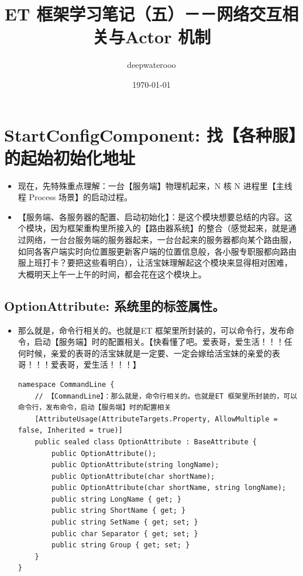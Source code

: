 \documentclass[9pt, b5paper]{article}
\author{deepwaterooo}
\date{\today}
\title{ET 框架学习笔记（五）－－网络交互相关与Actor 机制}
\begin{document}
\maketitle
\tableofcontents


\section{StartConfigComponent: 找【各种服】的起始初始化地址}
\label{sec-1}
\begin{itemize}
\item 现在，先特殊重点理解：一台【服务端】物理机起来，N 核 N 进程里【主线程 Process 场景】的启动过程。
\item 【服务端、各服务器的配置、启动初始化】：是这个模块想要总结的内容。这个模块，因为框架重构里所接入的【路由器系统】的整合（感觉起来，就是通过网络，一台台服务端的服务器起来，一台台起来的服务器都向某个路由服，如同各客户端实时向位置服更新客户端的位置信息般，各小服专职服都向路由服上班打卡？要把这些看明白），让活宝妹理解起这个模块来显得相对困难，大概明天上午一上午的时间，都会花在这个模块上。
\end{itemize}
\subsection{OptionAttribute: 系统里的标签属性。}
\label{sec-1-1}
\begin{itemize}
\item 那么就是，命令行相关的。也就是ET 框架里所封装的，可以命令行，发布命令，启动【服务端】时的配置相关。【快看懂了吧。爱表哥，爱生活！！！任何时候，亲爱的表哥的活宝妹就是一定要、一定会嫁给活宝妹的亲爱的表哥！！！爱表哥，爱生活！！！】
\begin{verbatim}
namespace CommandLine {
    // 【CommandLine】：那么就是，命令行相关的。也就是ET 框架里所封装的，可以命令行，发布命令，启动【服务端】时的配置相关
    [AttributeUsage(AttributeTargets.Property, AllowMultiple = false, Inherited = true)]
    public sealed class OptionAttribute : BaseAttribute {
        public OptionAttribute();
        public OptionAttribute(string longName);
        public OptionAttribute(char shortName);
        public OptionAttribute(char shortName, string longName);
        public string LongName { get; }
        public string ShortName { get; }
        public string SetName { get; set; }
        public char Separator { get; set; }
        public string Group { get; set; }
    }
}
\end{verbatim}
\end{itemize}
\end{document}
